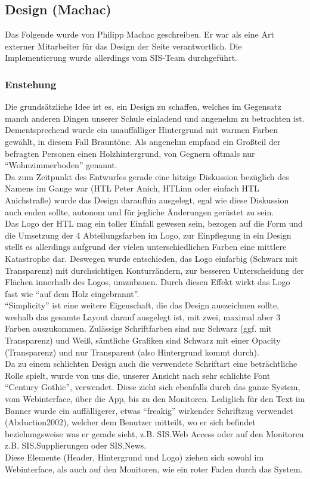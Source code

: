\subsection{Design (Machac)}
\label{sec:content_design}
Das Folgende wurde von Philipp Machac geschreiben. Er war als eine Art externer Mitarbeiter für das Design der Seite verantwortlich. Die Implementierung wurde allerdings vom SIS-Team durchgeführt.
\subsubsection{Enstehung}
Die grundsätzliche Idee ist es, ein Design zu schaffen, welches im Gegensatz manch anderen Dingen unserer Schule einladend und angenehm zu betrachten ist. Dementsprechend wurde ein unauffälliger Hintergrund mit warmen Farben gewählt, in diesem Fall Brauntöne. Als angenehm empfand ein Großteil der befragten Personen einen Holzhintergrund, von Gegnern oftmals nur \enquote{Wohnzimmerboden} genannt.\\
Da zum Zeitpunkt des Entwurfes gerade eine hitzige Diskussion bezüglich des Namens im Gange war (HTL Peter Anich, HTLinn oder einfach HTL Anichstraße) wurde das Design daraufhin ausgelegt, egal wie diese Diskussion auch enden sollte, autonom und für jegliche Änderungen gerüstet zu sein.\\
Das Logo der HTL mag ein toller Einfall gewesen sein, bezogen auf die Form und die Umsetzung der 4 Abteilungsfarben im Logo, zur Einpflegung in ein Design stellt es allerdings aufgrund der vielen unterschiedlichen Farben eine mittlere Katastrophe dar. Deswegen wurde entschieden, das Logo einfarbig (Schwarz mit Transparenz) mit durchsichtigen Konturrändern, zur besseren Unterscheidung der Flächen innerhalb des Logos, umzubauen. Durch diesen Effekt wirkt das Logo fast wie \enquote{auf dem Holz eingebrannt}.\\
\enquote{Simplicity} ist eine weitere Eigenschaft, die das Design auszeichnen sollte, weshalb das gesamte Layout darauf ausgelegt ist, mit zwei, maximal aber 3 Farben auszukommen. Zulässige Schriftfarben sind nur Schwarz (ggf. mit Transparenz) und Weiß, sämtliche Grafiken sind Schwarz mit einer Opacity (Transparenz) und nur Transparent (also Hintergrund kommt durch).\\
Da zu  einem schlichten Design auch die verwendete Schriftart eine beträchtliche Rolle spielt, wurde von uns die, unserer Ansicht nach sehr schlichte Font \enquote{Century Gothic}, verwendet. Diese zieht sich ebenfalls durch das ganze System, vom Webinterface, über die App, bis zu den Monitoren. Lediglich für den Text im Banner wurde ein auffälligerer, etwas \enquote{freakig} wirkender Schriftzug verwendet (Abduction2002), welcher dem Benutzer mitteilt, wo er sich befindet beziehungsweise was er gerade sieht, z.B. SIS.Web Access oder auf den Monitoren z.B. SIS.Supplierungen oder SIS.News.\\
Diese Elemente (Header, Hintergrund und Logo) ziehen sich sowohl im Webinterface, als auch auf den Monitoren, wie ein roter Faden durch das System.\\
